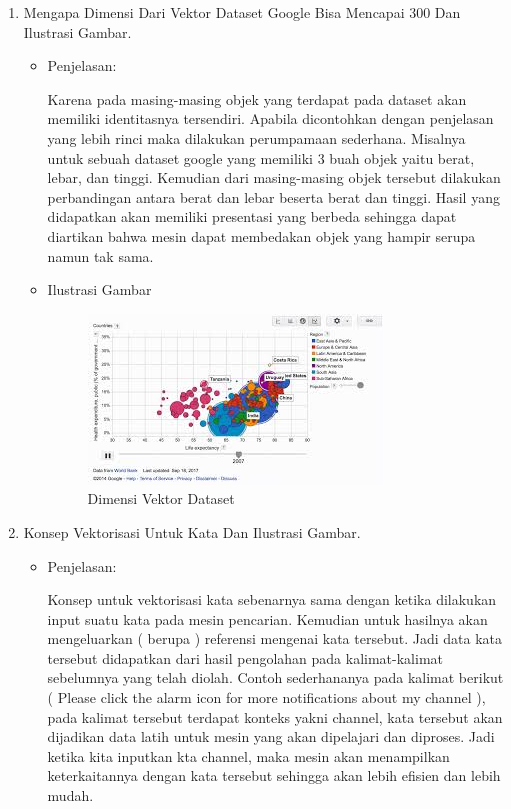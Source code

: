 \begin{enumerate}
\item Mengapa Dimensi Dari Vektor Dataset Google Bisa Mencapai 300 Dan Ilustrasi Gambar.
\begin{itemize}
\item Penjelasan:

Karena pada masing-masing objek yang terdapat pada dataset akan memiliki identitasnya tersendiri. Apabila dicontohkan dengan penjelasan yang lebih rinci maka dilakukan perumpamaan sederhana. Misalnya untuk sebuah dataset google yang memiliki 3 buah objek yaitu berat, lebar, dan tinggi.  Kemudian dari masing-masing objek tersebut dilakukan perbandingan antara berat dan lebar beserta berat dan tinggi. Hasil yang didapatkan akan memiliki presentasi yang berbeda sehingga dapat diartikan bahwa mesin dapat membedakan objek yang hampir serupa namun tak sama.

\item Ilustrasi Gambar

\begin{figure}[H]
\centering
\includegraphics[scale=0.8]{figures/1174051/5/7.jpg}
\caption{Dimensi Vektor Dataset}
\label{Dimensi Vektor Dataset}
\end{figure}

\end{itemize}

\item Konsep Vektorisasi Untuk Kata Dan Ilustrasi Gambar.
\begin{itemize}
\item  Penjelasan:

Konsep untuk vektorisasi kata sebenarnya sama dengan ketika dilakukan input suatu kata pada mesin pencarian. Kemudian untuk hasilnya akan mengeluarkan ( berupa ) referensi mengenai kata tersebut. Jadi data kata tersebut didapatkan dari hasil pengolahan pada kalimat-kalimat sebelumnya yang telah diolah. Contoh sederhananya pada kalimat berikut ( Please click the alarm icon for more notifications about my channel ), pada kalimat tersebut terdapat konteks yakni channel, kata tersebut akan dijadikan data latih untuk mesin yang akan dipelajari dan diproses. Jadi ketika kita inputkan kta channel, maka mesin akan menampilkan keterkaitannya dengan kata tersebut sehingga akan lebih efisien dan lebih mudah.


\end{itemize}
\end{enumerate}
